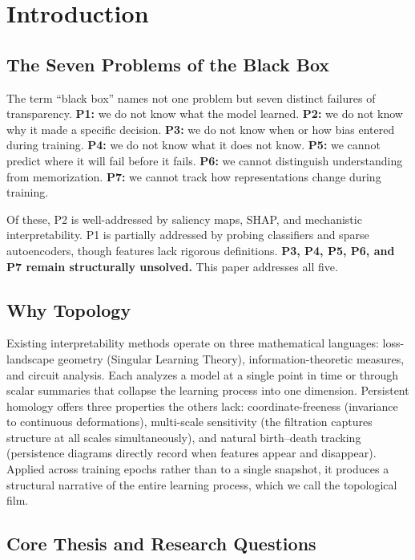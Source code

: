 \documentclass[10pt]{article}
\begin{document}
\section{Introduction}

\subsection{The Seven Problems of the Black Box}

The term ``black box'' names not one problem but seven distinct failures of transparency. \textbf{P1:} we do not know what the model learned. \textbf{P2:} we do not know why it made a specific decision. \textbf{P3:} we do not know when or how bias entered during training. \textbf{P4:} we do not know what it does not know. \textbf{P5:} we cannot predict where it will fail before it fails. \textbf{P6:} we cannot distinguish understanding from memorization. \textbf{P7:} we cannot track how representations change during training.

Of these, P2 is well-addressed by saliency maps, SHAP, and mechanistic interpretability. P1 is partially addressed by probing classifiers and sparse autoencoders, though features lack rigorous definitions. \textbf{P3, P4, P5, P6, and P7 remain structurally unsolved.} This paper addresses all five.

\subsection{Why Topology}

Existing interpretability methods operate on three mathematical languages: loss-landscape geometry (Singular Learning Theory), information-theoretic measures, and circuit analysis. Each analyzes a model at a single point in time or through scalar summaries that collapse the learning process into one dimension. Persistent homology offers three properties the others lack: coordinate-freeness (invariance to continuous deformations), multi-scale sensitivity (the filtration captures structure at all scales simultaneously), and natural birth--death tracking (persistence diagrams directly record when features appear and disappear). Applied across training epochs rather than to a single snapshot, it produces a structural narrative of the entire learning process, which we call the topological film.

\subsection{Core Thesis and Research Questions}
\end{document}
